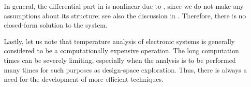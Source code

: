 In general, the differential part in  is
nonlinear due to \vp, since we do not make any assumptions about its structure;
see also the discussion in . Therefore, there is no
closed-form solution to the system.

Lastly, let us note that temperature analysis of electronic systems is generally
considered to be a computationally expensive operation. The long computation
times can be severely limiting, especially when the analysis is to be performed
many times for such purposes as design-space exploration. Thus, there is always
a need for the development of more efficient techniques.

